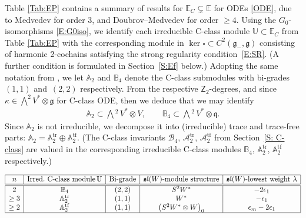 \documentclass[pdftex]{sigma}%
\newcommand\tensor{\otimes}
\DeclareMathOperator{\tf}{tf}
\DeclareMathOperator{\tr}{tr}
\newcommand{\g}{\mathfrak{g}}
\newcommand\fg{\mathfrak{g}}
\newcommand\fsl{\mathfrak{sl}}
\newcommand\fq {\mathfrak{q}}
\newcommand\bbE{\mathbb{E}}
\newcommand\bbU{\mathbb{U}}
\newcommand\bbA{\mathbb{A}}
\newcommand\bbB{\mathbb{B}}
\newcommand\sfZ{\mathsf{Z}}
\newcommand\cA{\mathcal{A}}
\newcommand\cB{\mathcal{B}}
\numberwithin{equation}{section}
\begin{document}
Table \ref{Tab:EP} contains a summary of results for $\bbE_C \subsetneq \bbE$ for ODEs \eqref{ODE}, due to Medvedev \cite{Medvedev2010,Medvedev2011} for order $3$, and Doubrov--Medvedev \cite{DM2014} for order $\ge 4$. Using the $G_0$-isomorphisms \eqref{E:G0iso}, we identify each irreducible C-class module $\bbU \subset \bbE_C$ from Table \ref{Tab:EP} with the corresponding module in $\ker\square \subset C^2(\g_-,\g)$ consisting of harmonic 2-cochains satisfying the strong regularity con\-di\-tion~\eqref{E:SR}. (A further condition is formulated in Section~\ref{S:Ef} below.) Adopting the same notation from \cite[Table 6]{KT2021}, we let $\bbA_2$ and $\bbB_4$ denote the C-class submodules with bi-grades~$(1,1)$ and~$(2,2)$ respectively. From the respective $\sfZ_2$-degrees, and since $\kappa \in \bigwedge^2 V^* \otimes \fg$ for C-class ODE, then we deduce that we may identify
 \begin{align} \label{E:A2B4}
 \bbA_2 \subset \bigwedge{\!}^2\, V^* \otimes V, \qquad \bbB_4 \subset \bigwedge{\!}^2\, V^* \otimes \fq.
 \end{align}
Since $\bbA_2$ is not irreducible, we decompose it into (irreducible) trace and trace-free parts: $\bbA_2 = \bbA_2^{\tr} \oplus \bbA_2^{\tf}$. (The C-class invariants $\cB_4$, $\cA_2^{\tr}$, $\cA_2^{\tf}$ from Section~\ref{S: C-class} are valued in the corresponding irreducible C-class modules $\bbB_4$, $\bbA_2^{\tr}$, $\bbA_2^{\tf}$ respectively.)

 \begin{table}[h]\renewcommand{\arraystretch}{1.2}
 \centering
 $\begin{array}{|c|c|c|c|c|} \hline
 n & \text{Irred.\ C-class module}\, \bbU & \text{Bi-grade} & \fsl(W)\text{-module structure} & \fsl(W) \text{-lowest weight } \lambda\\ \hline\hline
 2 & \bbB_4 & (2,2) & S^2 W^{\ast} & -2\epsilon_1\\	
 \geq 3 & \bbA_2^{\tr} & (1,1) & W^{\ast} & -\epsilon_1\\	
 \ge 2 & \bbA_2^{\tf} & (1,1) & \bigl(S^2 W^{\ast}\tensor W\bigr)_0 & \epsilon_m - 2\epsilon_1\\\hline
 \end{array}$
 \caption{C-class modules in $\bbE_C \subsetneq \bbE \subsetneq H^2_{+}(\g_{-},\g)$ for vector ODEs of order $n+1 \geq 3$.}
 \label{Tab:EP}
 \end{table}
\end{document}
